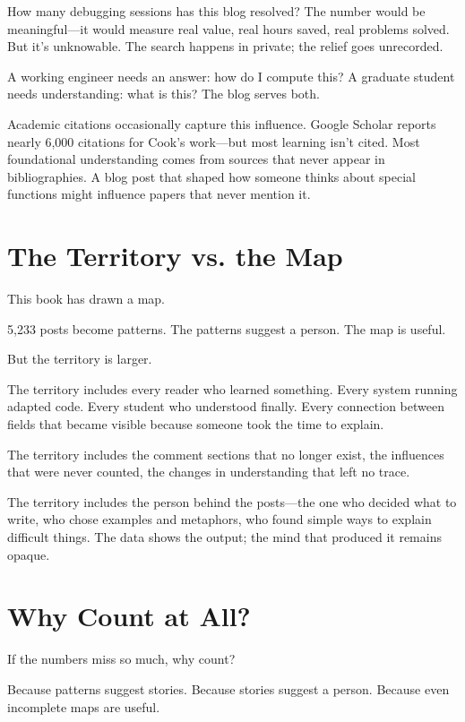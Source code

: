 How many debugging sessions has this blog resolved? The number would be meaningful—it would measure real value, real hours saved, real problems solved. But it's unknowable. The search happens in private; the relief goes unrecorded.

A working engineer needs an answer: how do I compute this? A graduate student needs understanding: what is this? The blog serves both.

Academic citations occasionally capture this influence. Google Scholar reports nearly 6,000 citations for Cook's work—but most learning isn't cited. Most foundational understanding comes from sources that never appear in bibliographies. A blog post that shaped how someone thinks about special functions might influence papers that never mention it.

\bigskip

\section*{The Territory vs. the Map}

This book has drawn a map.

5,233 posts become patterns. The patterns suggest a person. The map is useful.

But the territory is larger.

The territory includes every reader who learned something. Every system running adapted code. Every student who understood finally. Every connection between fields that became visible because someone took the time to explain.

The territory includes the comment sections that no longer exist, the influences that were never counted, the changes in understanding that left no trace.

The territory includes the person behind the posts—the one who decided what to write, who chose examples and metaphors, who found simple ways to explain difficult things. The data shows the output; the mind that produced it remains opaque.

\bigskip

\section*{Why Count at All?}

If the numbers miss so much, why count?

Because patterns suggest stories. Because stories suggest a person. Because even incomplete maps are useful.

